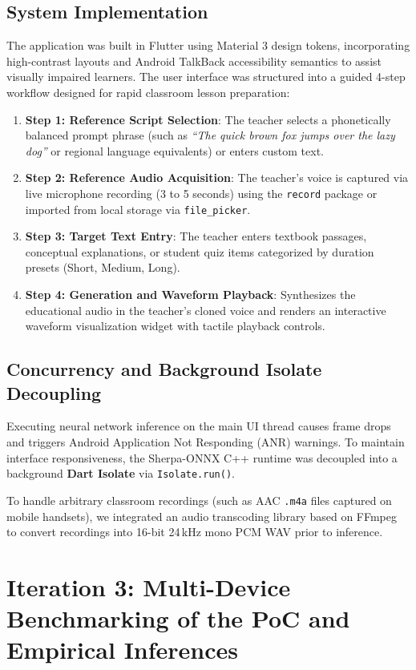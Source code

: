 \subsection{System Implementation}
The application was built in Flutter using Material 3 design tokens, incorporating high-contrast layouts and Android TalkBack accessibility semantics to assist visually impaired learners. The user interface was structured into a guided 4-step workflow designed for rapid classroom lesson preparation:
\begin{enumerate}
    \item \textbf{Step 1: Reference Script Selection}: The teacher selects a phonetically balanced prompt phrase (such as \textit{``The quick brown fox jumps over the lazy dog''} or regional language equivalents) or enters custom text.
    \item \textbf{Step 2: Reference Audio Acquisition}: The teacher's voice is captured via live microphone recording (3 to 5 seconds) using the \texttt{record} package or imported from local storage via \texttt{file\_picker}.
    \item \textbf{Step 3: Target Text Entry}: The teacher enters textbook passages, conceptual explanations, or student quiz items categorized by duration presets (Short, Medium, Long).
    \item \textbf{Step 4: Generation and Waveform Playback}: Synthesizes the educational audio in the teacher's cloned voice and renders an interactive waveform visualization widget with tactile playback controls.
\end{enumerate}

\subsection{Concurrency and Background Isolate Decoupling}
Executing neural network inference on the main UI thread causes frame drops and triggers Android Application Not Responding (ANR) warnings. To maintain interface responsiveness, the Sherpa-ONNX C++ runtime was decoupled into a background \textbf{Dart Isolate} via \texttt{Isolate.run()}.

To handle arbitrary classroom recordings (such as AAC \texttt{.m4a} files captured on mobile handsets), we integrated an audio transcoding library based on FFmpeg to convert recordings into 16-bit 24\,kHz mono PCM WAV prior to inference.

\section{Iteration 3: Multi-Device Benchmarking of the PoC and Empirical Inferences}
